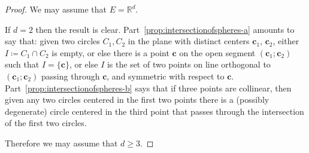 \documentclass[12pt]{amsart}
\newcommand{\R}{\mathbb{R}}	%
\newcommand{\set}[1]{\mathopen \{ {#1} \mathclose \}} %
\theoremstyle{plain}
\theoremstyle{definition}
\theoremstyle{remark}
\begin{document}
\begin{proof}
We may assume that \( E = \R^d \).

If \( d = 2 \) then the result is clear.
Part~\ref{prop:intersectionofspheres-a} amounts to say that: given two circles \( C_1 , C_2 \) in the plane with distinct centers \( \mathbf{c}_1 \), \( \mathbf{c}_2 \), either \( I \coloneqq C_1 \cap C_2 \) is empty, or else there is a point \( \mathbf{c} \) on the open segment \( ( \mathbf{c}_1 ; \mathbf{c}_2 ) \) such that \( I = \set{\mathbf{c}} \), or else \( I \) is the set of two points on line orthogonal to \( ( \mathbf{c}_1 ; \mathbf{c}_2 ) \) passing through \( \mathbf{c} \), and symmetric with respect to \( \mathbf{c} \).
Part~\ref{prop:intersectionofspheres-b} says that if three points are collinear, then given any two circles centered in the first two points there is a (possibly degenerate) circle centered in the third point that passes through the intersection of the first two circles.

Therefore we may assume that \( d \geq 3 \).

\smallskip


\end{proof}
\end{document}
